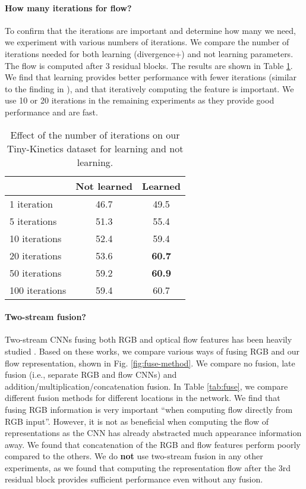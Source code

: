 \documentclass[10pt,twocolumn,letterpaper]{article}
\begin{document}
\vspace{-3pt}
\paragraph{How many iterations for flow?} To confirm that the iterations are important and determine how many we need, we experiment with various numbers of iterations. We compare the number of iterations needed for both learning (divergence+) and not learning parameters. The flow is computed after 3 residual blocks. The results are shown in Table \ref{tab:iters}. We find that learning provides better performance with fewer iterations (similar to the finding in \cite{fan2018end}), and that iteratively computing the feature is important. We use 10 or 20 iterations in the remaining experiments as they provide good performance and are fast.

\begin{table}
  \caption{Effect of the number of iterations on our Tiny-Kinetics dataset for learning and not learning.}
  \label{tab:iters}
  \centering
  \begin{tabular}{lcc}
    \toprule
                   &  Not learned & Learned \\
    \midrule
    1 iteration       & 46.7  & 49.5   \\
    5 iterations      & 51.3  & 55.4  \\
    10 iterations     & 52.4  & 59.4  \\
    20 iterations     & 53.6  & {\bf 60.7}   \\
    50 iterations     & 59.2  & {\bf 60.9}   \\
    100 iterations    & 59.4  & 60.7 \\
    \bottomrule
  \end{tabular}
\end{table}


\vspace{-3pt}
\paragraph{Two-stream fusion?} Two-stream CNNs fusing both RGB and optical flow features has been heavily studied \cite{simonyan2014two,feichtenhofer2016convolutional}. Based on these works, we compare various ways of fusing RGB and our flow representation, shown in Fig. \ref{fig:fuse-method}. We compare no fusion, late fusion (i.e., separate RGB and flow CNNs) and addition/multiplication/concatenation fusion. In Table \ref{tab:fuse}, we compare different fusion methods for different locations in the network. We find that fusing RGB information is very important ``when computing flow directly from RGB input''. However, it is not as beneficial when computing the flow of representations as the CNN has already abstracted much appearance information away. We found that concatenation of the RGB and flow features perform poorly compared to the others. We do \textbf{not} use two-stream fusion in any other experiments, as we found that computing the representation flow after the 3rd residual block provides sufficient performance even without any fusion.
\end{document}
